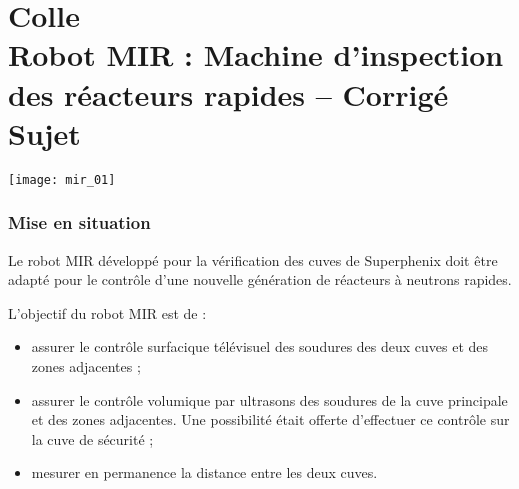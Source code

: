 \chapter*{Colle  \\
Robot MIR : Machine d'inspection des réacteurs rapides -- \ifprof Corrigé \else Sujet \fi}


\iflivret {} \else
\ifprof  {} \else \fi
\fi
\setcounter{question}{0}

\begin{marginfigure}
\texttt{[image: mir\_01]}
\end{marginfigure}


\subsection*{Mise en situation}

Le robot MIR développé pour la vérification des cuves de Superphenix doit être adapté pour le contrôle d’une nouvelle génération de réacteurs à neutrons rapides.

L’objectif du robot MIR est de :
\begin{itemize}
\item assurer le contrôle surfacique télévisuel des soudures des deux cuves et des zones adjacentes ;
\item assurer le contrôle volumique par ultrasons des soudures de la cuve principale et des zones adjacentes. Une possibilité était offerte d’effectuer ce contrôle sur la cuve de sécurité ;
\item mesurer en permanence la distance entre les deux cuves.
\end{itemize}

